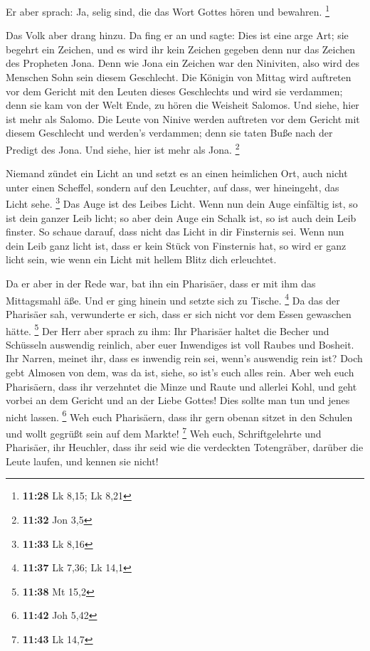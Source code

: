  Er aber sprach: Ja, selig sind, die das Wort Gottes
hören und bewahren. \footnote{\textbf{11:28} Lk 8,15; Lk 8,21}

 Das Volk aber drang hinzu. Da fing er an und sagte: Dies
ist eine arge Art; sie begehrt ein Zeichen, und es wird ihr kein Zeichen
gegeben denn nur das Zeichen des Propheten Jona.  Denn
wie Jona ein Zeichen war den Niniviten, also wird des Menschen Sohn sein
diesem Geschlecht.  Die Königin von Mittag wird auftreten
vor dem Gericht mit den Leuten dieses Geschlechts und wird sie
verdammen; denn sie kam von der Welt Ende, zu hören die Weisheit
Salomos. Und siehe, hier ist mehr als Salomo.  Die Leute
von Ninive werden auftreten vor dem Gericht mit diesem Geschlecht und
werden's verdammen; denn sie taten Buße nach der Predigt des Jona. Und
siehe, hier ist mehr als Jona. \footnote{\textbf{11:32} Jon 3,5}

 Niemand zündet ein Licht an und setzt es an einen
heimlichen Ort, auch nicht unter einen Scheffel, sondern auf den
Leuchter, auf dass, wer hineingeht, das Licht sehe. \footnote{\textbf{11:33}
  Lk 8,16}  Das Auge ist des Leibes Licht. Wenn nun dein
Auge einfältig ist, so ist dein ganzer Leib licht; so aber dein Auge ein
Schalk ist, so ist auch dein Leib finster.  So schaue
darauf, dass nicht das Licht in dir Finsternis sei.  Wenn
nun dein Leib ganz licht ist, dass er kein Stück von Finsternis hat, so
wird er ganz licht sein, wie wenn ein Licht mit hellem Blitz dich
erleuchtet.

 Da er aber in der Rede war, bat ihn ein Pharisäer, dass
er mit ihm das Mittagsmahl äße. Und er ging hinein und setzte sich zu
Tische. \footnote{\textbf{11:37} Lk 7,36; Lk 14,1}  Da
das der Pharisäer sah, verwunderte er sich, dass er sich nicht vor dem
Essen gewaschen hätte. \footnote{\textbf{11:38} Mt 15,2} 
Der Herr aber sprach zu ihm: Ihr Pharisäer haltet die Becher und
Schüsseln auswendig reinlich, aber euer Inwendiges ist voll Raubes und
Bosheit.  Ihr Narren, meinet ihr, dass es inwendig rein
sei, wenn's auswendig rein ist?  Doch gebt Almosen von
dem, was da ist, siehe, so ist's euch alles rein.  Aber
weh euch Pharisäern, dass ihr verzehntet die Minze und Raute und
allerlei Kohl, und geht vorbei an dem Gericht und an der Liebe Gottes!
Dies sollte man tun und jenes nicht lassen. \footnote{\textbf{11:42} Joh
  5,42}  Weh euch Pharisäern, dass ihr gern obenan sitzet
in den Schulen und wollt gegrüßt sein auf dem Markte! \footnote{\textbf{11:43}
  Lk 14,7}  Weh euch, Schriftgelehrte und Pharisäer, ihr
Heuchler, dass ihr seid wie die verdeckten Totengräber, darüber die
Leute laufen, und kennen sie nicht!

